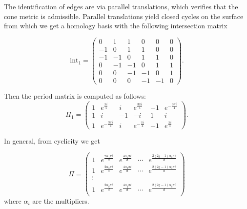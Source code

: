 \documentclass[12pt,reqno]{amsart}
\newcommand{\R}{\mathbb{R}}
\theoremstyle{definition}
\theoremstyle{remark}
\begin{document}
The identification of edges are via parallel translations, which verifies that the cone metric is admissible. Parallel translations yield closed cycles on the surface from which we get a homology basis with the following intersection matrix

$$\textrm{int}_1 = \begin{pmatrix} 0 & 1 & 1 & 0 & 0 & 0 \\
 -1 & 0 & 1 & 1 & 0 & 0 \\
 -1 & -1 & 0 & 1 & 1 & 0 \\
 0 & -1 & -1 & 0 & 1 & 1 \\
 0 & 0 & -1 & -1 & 0 & 1 \\
 0 & 0 & 0 & -1 & -1 & 0 \end{pmatrix}.$$

Then the period matrix is computed as follows: 
$$\Pi_1 = \left(
\begin{array}{cccccc}
 1 & e^{\frac{\pi i}{4}} & i & e^{\frac{3 \pi i}{4}} & -1 & e^{-\frac{3 \pi i}{4}} \\
 1 & i & -1 & -i & 1 & i \\
 1 & e^{-\frac{3 \pi i}{4}} & i & e^{-\frac{\pi i}{4}} & -1 & e^{\frac{\pi i}{4}} 
\end{array}
\right).$$


In general, from cyclicity we get 

$$\Pi = \left(
\begin{array}{ccccc}
 1 & e^{\frac{2 \alpha_1 \pi i}{d}} & e^{\frac{4 \alpha_1 \pi i}{d}} & \cdots & e^{\frac{2 (2 g - 1) \alpha_1 \pi i}{d}} \\
 1 & e^{\frac{2 \alpha_2 \pi i}{d}} & e^{\frac{4 \alpha_2 \pi i}{d}} & \cdots & e^{\frac{2 (2 g - 1) \alpha_2 \pi i}{d}} \\
 \vdots\\
 1 & e^{\frac{2 \alpha_g \pi i}{d}} & e^{\frac{4 \alpha_g \pi i}{d}} & \cdots & e^{\frac{2 (2 g - 1) \alpha_g \pi i}{d}} \\
\end{array}
\right)$$
where $\alpha_i$ are the multipliers.




\end{document}

